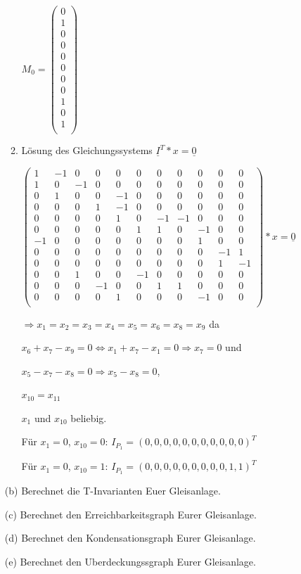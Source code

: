 \documentclass{scrreprt}
\begin{document}
\begin{enumerate}
\begin{enumerate}
\( M_0 = \begin{pmatrix}
0 \\ %
1 \\ %
0 \\ %
0 \\ %
0 \\ %
0 \\ %
0 \\ %
0 \\ %
1 \\ %
0 \\ %
1 \\ %
\end{pmatrix} \)

\item Lösung des Gleichungssystems \( \underline{I}^T * x = \underline{0} \)

\( \begin{pmatrix}
 1 &-1 & 0 & 0 & 0 & 0 & 0 & 0 & 0 & 0 & 0  \\
 1 & 0 &-1 & 0 & 0 & 0 & 0 & 0 & 0 & 0 & 0  \\
 0 & 1 & 0 & 0 &-1 & 0 & 0 & 0 & 0 & 0 & 0  \\
 0 & 0 & 0 & 1 &-1 & 0 & 0 & 0 & 0 & 0 & 0  \\
 0 & 0 & 0 & 0 & 1 & 0 &-1 &-1 & 0 & 0 & 0  \\
 0 & 0 & 0 & 0 & 0 & 1 & 1 & 0 &-1 & 0 & 0  \\
-1 & 0 & 0 & 0 & 0 & 0 & 0 & 0 & 1 & 0 & 0  \\
 0 & 0 & 0 & 0 & 0 & 0 & 0 & 0 & 0 &-1 & 1  \\
 0 & 0 & 0 & 0 & 0 & 0 & 0 & 0 & 0 & 1 &-1  \\
 0 & 0 & 1 & 0 & 0 &-1 & 0 & 0 & 0 & 0 & 0  \\
 0 & 0 & 0 &-1 & 0 & 0 & 1 & 1 & 0 & 0 & 0  \\
 0 & 0 & 0 & 0 & 1 & 0 & 0 & 0 &-1 & 0 & 0  \\
\end{pmatrix} * x = \underline{0}\)

\( \Rightarrow x_1 = x_2 = x_3 = x_4 = x_5 = x_6 = x_8 = x_9\) da

\( x_6 + x_7 - x_9 = 0 \Leftrightarrow x_1 + x_7 - x_1 = 0 \Rightarrow x_7 = 0 \) und

\( x_5 - x_7 - x_8 = 0 \Rightarrow x_5 - x_8 = 0 \),

\( x_{10} = x_{11} \)

\( x_1 \) und \( x_{10} \) beliebig.

Für \(x_1=0\), \(x_{10}=0\): \(I_{P_1} = (0, 0, 0, 0, 0, 0, 0, 0, 0, 0, 0)^T\)

Für \(x_1=0\), \(x_{10}=1\): \(I_{P_1} = (0, 0, 0, 0, 0, 0, 0, 0, 0, 1, 1)^T\)

\end{enumerate}

(b) Berechnet die T-Invarianten Euer Gleisanlage.

(c) Berechnet den Erreichbarkeitsgraph Eurer Gleisanlage.

(d) Berechnet den Kondensationsgraph Eurer Gleisanlage.

(e) Berechnet den Uberdeckungssgraph Eurer Gleisanlage.


\end{enumerate}
\end{document}
